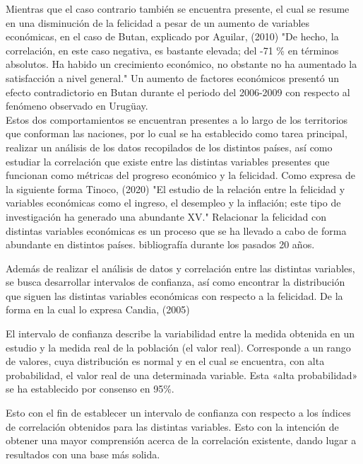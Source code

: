 \documentclass[12pt,oneside,letterpaper,spanish]{article}
\begin{document}
Mientras que el caso contrario también se encuentra presente, el cual se resume en una disminución de la felicidad a pesar de un aumento de variables económicas, en el caso de Butan, explicado por Aguilar, (2010) "De hecho, la correlación, en este caso negativa, es bastante elevada; del -71 \% en términos absolutos. Ha habido un crecimiento económico, no obstante no ha aumentado la satisfacción a nivel general." Un aumento de factores económicos presentó un efecto contradictorio en Butan durante el periodo del 2006-2009 con respecto al fenómeno observado en Urug\"uay.\\

Estos dos comportamientos se encuentran presentes a lo largo de los territorios que conforman las naciones, por lo cual se ha establecido como tarea principal, realizar un análisis de los datos recopilados de los distintos países, así como estudiar la correlación que existe entre las distintas variables presentes que funcionan como métricas del progreso económico y la felicidad. Como expresa de la siguiente forma Tinoco, (2020) "El estudio de la relación entre la felicidad y variables económicas como el ingreso, el desempleo y la inflación; este tipo de investigación ha generado una abundante XV." Relacionar la felicidad con distintas variables económicas es un proceso que se ha llevado a cabo de forma abundante en distintos países.
bibliografía durante los pasados 20 años.\\

\pagebreak
    
Además de realizar el análisis de datos y correlación entre las distintas variables, se busca desarrollar intervalos de confianza, así como encontrar la distribución que siguen las distintas variables económicas con respecto a la felicidad. De la forma en la cual lo expresa Candia, (2005) 

\begin{displayquote}
    El intervalo de confianza describe la variabilidad entre la medida obtenida en un estudio y la medida real de la población (el valor real). Corresponde a un rango de valores, cuya distribución es normal y en el cual se encuentra, con alta probabilidad, el valor real de una determinada variable. Esta «alta probabilidad» se ha establecido por consenso en 95\%.
\end{displayquote}

    

Esto con el fin de establecer un intervalo de confianza con respecto a los índices de correlación obtenidos para las distintas variables. Esto con la intención de obtener una mayor comprensión acerca de la correlación existente, dando lugar a resultados con una base más solida.\\
\end{document}
